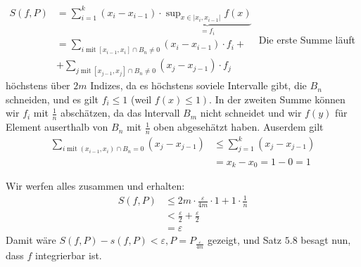 \documentclass[a4paper,8pt]{extarticle}
\begin{document}
\begin{enumerate}
$
\begin{aligned}
  S(f, P) &=\sum_{i=1}^{k}\left(x_{i}-x_{i-1}\right) \cdot \underbrace{\sup _{x \in\left|x_{i}, x_{i-1}\right|} f(x)}_{=f_{i}} \\
  &=\sum_{i \operatorname{mit} \left[x_{i-1}, x_{i}\right] \cap B_{n} \neq 0}\left(x_{i}-x_{i-1}\right) \cdot f_{i} + \\
  &+\sum_{j \operatorname{mit} \left[x_{j-1}, x_{j}\right] \cap B_{n} \neq 0}\left(x_{j}-x_{j-1}\right) \cdot f_{j}
\end{aligned}
$
Die erste Summe läuft höchstens über $2m$ Indizes, da es höchstens soviele Intervalle gibt, die $B_{n}$ schneiden, und es gilt $f_{i} \leq 1$ (weil $\left.f(x) \leq 1\right)$. In der zweiten Summe können wir $f_{i}$ mit $\frac{1}{n}$ abschätzen, da das lntervall $B_{m}$ nicht schneidet und wir $f(y)$ für Element auserthalb von $B_{n}$ mit $\frac{1}{n}$ oben abgesehätzt haben. Auserdem gilt
$$
\begin{aligned}
\sum_{i \operatorname{mit}\left(x_{i-1}, x_{i}\right) \cap B_{n}=0}\left(x_{j}-x_{j-1}\right) &\leq \sum_{j=1}^{k}\left(x_{j}-x_{j-1}\right)\\&=x_{k}-x_{0}=1-0=1
\end{aligned}
$$

Wir werfen alles zusammen und erhalten:
$$
\begin{aligned}
S(f, P) & \leq 2m \cdot \frac{\varepsilon}{4m} \cdot 1+1 \cdot \frac{1}{n} \\
&<\frac{\varepsilon}{2}+\frac{\varepsilon}{2} \\
&=\varepsilon
\end{aligned}
$$
Damit wäre $S(f, P)-s(f, P)<\varepsilon, P=P_{\frac{\varepsilon}{4m}}$
gezeigt, und Satz $5.8$ besagt nun, dass $f$ integrierbar ist.


\end{enumerate}
\end{document}
